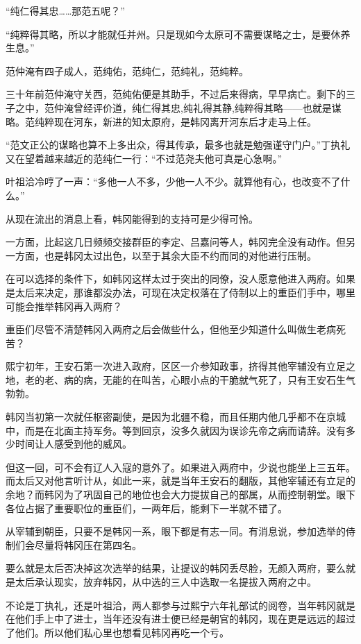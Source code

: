 “纯仁得其忠……那范五呢？”

“纯粹得其略，所以才能就任并州。只是现如今太原可不需要谋略之士，是要休养生息。”

范仲淹有四子成人，范纯佑，范纯仁，范纯礼，范纯粹。

三十年前范仲淹守关西，范纯佑便是其助手，不过后来得病，早早病亡。剩下的三子之中，范仲淹曾经评价道，纯仁得其忠,纯礼得其静,纯粹得其略——也就是谋略。范纯粹现在河东，新进的知太原府，是韩冈离开河东后才走马上任。

“范文正公的谋略也算不上多出众，得其传承，最多也就是勉强谨守门户。”丁执礼又在望着越来越近的范纯仁一行：“不过范尧夫他可真是心急啊。”

叶祖洽冷哼了一声：“多他一人不多，少他一人不少。就算他有心，也改变不了什么。”

从现在流出的消息上看，韩冈能得到的支持可是少得可怜。

一方面，比起这几日频频交接群臣的李定、吕嘉问等人，韩冈完全没有动作。但另一方面，也是韩冈太过出色，以至于其余大臣不约而同的对他进行压制。

在可以选择的条件下，如韩冈这样太过于突出的同僚，没人愿意他进入两府。如果是太后来决定，那谁都没办法，可现在决定权落在了侍制以上的重臣们手中，哪里可能会推举韩冈再入两府？

重臣们尽管不清楚韩冈入两府之后会做些什么，但他至少知道什么叫做生老病死苦？

熙宁初年，王安石第一次进入政府，区区一介参知政事，挤得其他宰辅没有立足之地，老的老、病的病，无能的在叫苦，心眼小点的干脆就气死了，只有王安石生气勃勃。

韩冈当初第一次就任枢密副使，是因为北疆不稳，而且任期内他几乎都不在京城中，而是在北面主持军务。等到回京，没多久就因为误诊先帝之病而请辞。没有多少时间让人感受到他的威风。

但这一回，可不会有辽人入寇的意外了。如果进入两府中，少说也能坐上三五年。而太后又对他言听计从，如此一来，就是当年王安石的翻版，其他宰辅还有立足的余地？而韩冈为了巩固自己的地位也会大力提拔自己的部属，从而控制朝堂。眼下各位占据了重要职位的重臣们，一两年后，能剩下一半就不错了。

从宰辅到朝臣，只要不是韩冈一系，眼下都是有志一同。有消息说，参加选举的侍制们会尽量将韩冈压在第四名。

要么就是太后否决掉这次选举的结果，让提议的韩冈丢尽脸，无颜入两府，要么就是太后承认现实，放弃韩冈，从中选的三人中选取一名提拔入两府之中。

不论是丁执礼，还是叶祖洽，两人都参与过熙宁六年礼部试的阅卷，当年韩冈就是在他们手上中了进士，当年还没有进士便已经是朝官的韩冈，现在更是远远的超过了他们。所以他们私心里也想看见韩冈再吃一个亏。

